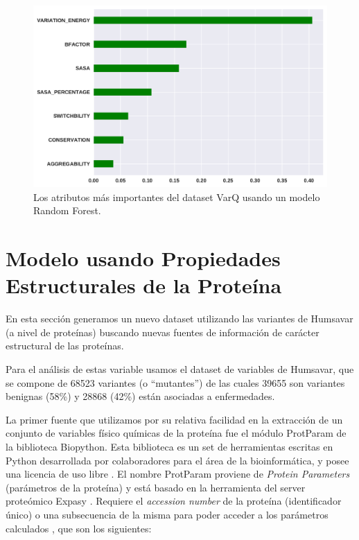 \begin{figure}[H]
    \centering
    \includegraphics[scale=0.55]{documents/latex/figures/3/importances_varq.pdf}
    \caption{Los atributos más importantes del dataset VarQ usando un modelo Random Forest. }
    \label{fig:importance_varq}
\end{figure}

\section{Modelo usando Propiedades Estructurales de la Proteína}

En esta sección generamos un nuevo dataset utilizando las variantes de Humsavar (a nivel de proteínas) buscando nuevas fuentes de información de carácter estructural de las proteínas.

Para el análisis de estas variable usamos el dataset de variables de Humsavar, que se compone de 68523 variantes (o ``mutantes'') de las cuales 39655 son variantes benignas (58\%) y 28868 (42\%) están asociadas a enfermedades. 

La primer fuente que utilizamos por su relativa facilidad en la extracción de un conjunto de variables físico químicas de la proteína fue el módulo ProtParam de la biblioteca Biopython. Esta biblioteca es un set de herramientas escritas en Python desarrollada por colaboradores para el área de la bioinformática, y posee una licencia de uso libre \todo{[citar]}.
El nombre ProtParam proviene de \textit{Protein Parameters} (parámetros de la proteína) y está basado en la herramienta del server proteómico Expasy \todo{[citar]}. Requiere el \textit{accession number} de la proteína (identificador único) o una subsecuencia de la misma para poder acceder a los parámetros calculados \todo{[citar]}, que son los siguientes:

